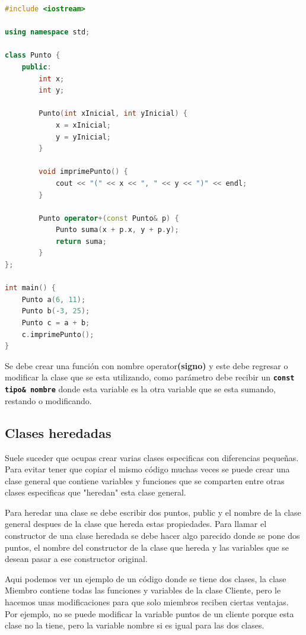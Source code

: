 \documentclass{article}
\begin{document}
\begin{lstlisting}[language=C++, title=Sobrecargamiento de operadores]
#include <iostream>

using namespace std;

class Punto {
	public:
		int x;
		int y;

		Punto(int xInicial, int yInicial) {
			x = xInicial;
			y = yInicial;
		}

		void imprimePunto() {
			cout << "(" << x << ", " << y << ")" << endl;
		}

		Punto operator+(const Punto& p) {
			Punto suma(x + p.x, y + p.y);
			return suma;
		}
};

int main() {
	Punto a(6, 11);
	Punto b(-3, 25);
	Punto c = a + b;
	c.imprimePunto();
}
\end{lstlisting}

Se debe crear una función con nombre operator\textbf{(signo)} y este debe regresar o modificar la clase que se esta utilizando, como parámetro debe recibir un \textbf{\lstinline{const tipo& nombre}} donde esta variable es la otra variable que se esta sumando, restando o modificando.

\subsection{Clases heredadas}

Suele suceder que ocupas crear varias clases especificas con diferencias pequeñas. Para evitar tener que copiar el mismo código muchas veces se puede crear una clase general que contiene variables y funciones que se comparten entre otras clases especificas que "heredan" esta clase general.

Para heredar una clase se debe escribir dos puntos, public y el nombre de la clase general despues de la clase que hereda estas propiedades. Para llamar el constructor de una clase heredada se debe hacer algo parecido donde se pone dos puntos, el nombre del constructor de la clase que hereda y las variables que se desean pasar a ese constructor original.

Aqui podemos ver un ejemplo de un código donde se tiene dos clases, la clase Miembro contiene todas las funciones y variables de la clase Cliente, pero le hacemos unas modificaciones para que solo miembros reciben ciertas ventajas. Por ejemplo, no se puede modificar la variable puntos de un cliente porque esta clase no la tiene, pero la variable nombre si es igual para las dos clases.
\end{document}
